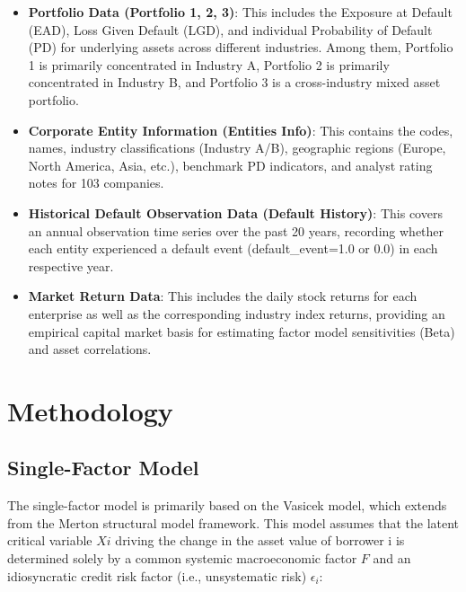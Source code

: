 \documentclass[12pt]{article}
\begin{document}
\begin{itemize}
\item \textbf{Portfolio Data (Portfolio 1, 2, 3)}: This includes the Exposure at Default (EAD), Loss Given Default (LGD), and individual Probability of Default (PD) for underlying assets across different industries. Among them, Portfolio 1 is primarily concentrated in Industry A, Portfolio 2 is primarily concentrated in Industry B, and Portfolio 3 is a cross-industry mixed asset portfolio.


\item \textbf{Corporate Entity Information (Entities Info)}: This contains the codes, names, industry classifications (Industry A/B), geographic regions (Europe, North America, Asia, etc.), benchmark PD indicators, and analyst rating notes for 103 companies.


\item \textbf{Historical Default Observation Data (Default History)}: This covers an annual observation time series over the past 20 years, recording whether each entity experienced a default event (default\_event=1.0 or 0.0) in each respective year.


\item \textbf{Market Return Data}: This includes the daily stock returns for each enterprise as well as the corresponding industry index returns, providing an empirical capital market basis for estimating factor model sensitivities (Beta) and asset correlations.


\end{itemize}





\section{Methodology}

\subsection{Single-Factor Model}
The single-factor model is primarily based on the Vasicek model, which extends from the Merton structural model framework. This model assumes that the latent critical variable $Xi$ driving the change in the asset value of borrower i is determined solely by a common systemic macroeconomic factor $F$ and an idiosyncratic credit risk factor (i.e., unsystematic risk) $\epsilon_i$:
\end{document}

